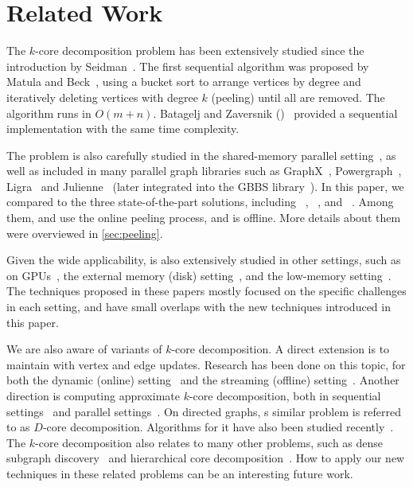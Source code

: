\section{Related Work}
The $k$-core decomposition problem has been extensively studied since the introduction by Seidman~\cite{seidman1983network}.
The first sequential algorithm was proposed by Matula and Beck~\cite{matula1983smallest},
using a bucket sort to arrange vertices by degree and iteratively deleting vertices with degree $k$ (peeling) until all are removed.
The algorithm runs in $O(m + n)$.
Batagelj and Zaversnik (\BZ)~\cite{batagelj2003m} provided a sequential implementation with the same time complexity. 

The \kcore{} problem is also carefully studied in the shared-memory parallel setting~\cite{dasari2014park,kabir2017parallel,dhulipala2017,montresor2011distributed,khaouid2015k,li2021k}, as well as included in many parallel graph libraries such as GraphX~\cite{gonzalez2014graphx}, Powergraph~\cite{gonzalez2012powergraph}, Ligra~\cite{shun2013ligra} and Julienne~\cite{dhulipala2017} (later integrated into the GBBS library~\cite{gbbs2021}).
In this paper, we compared to the three state-of-the-part solutions, including \ParK~\cite{dasari2014park}, \PKC~\cite{kabir2017parallel}, and \Julienne{}~\cite{dhulipala2017}.
Among them, \ParK and \PKC use the online peeling process, and \Julienne is offline.
More details about them were overviewed in \cref{sec:peeling}.

Given the wide applicability, \kcore is also extensively studied in other settings, such as on GPUs~\cite{mehrafsa2020vectorising, ahmad2023accelerating, zhao2024pico, li2021k, tripathy2018scalable, zhao2024speedcore, zhang2017accelerating, wang2016gunrock}, the external memory (disk) setting~\cite{cheng2011efficient, wen2018efficient}, and the low-memory setting~\cite{khaouid2015k}.
The techniques proposed in these papers mostly focused on the specific challenges in each setting, and have small overlaps with the new techniques introduced in this paper.

We are also aware of variants of $k$-core decomposition.
A direct extension is to maintain \kcore with vertex and edge updates.
Research has been done on this topic, for both the dynamic (online) setting~\cite{aksu2014distributed, aridhi2016distributed, gabert2022batch,liu2022parallel} and the streaming (offline) setting~\cite{sariyuce2013streaming, esfandiari2018parallel, sariyuce2016incremental}.
Another direction is computing approximate $k$-core decomposition, both in sequential settings~\cite{king2022computing} 
and parallel settings~\cite{esfandiari2018parallel,liu2022parallel, liu2024parallel, dhulipala2022differential}.
On directed graphs, s similar problem is referred to as $D$-core decomposition.
Algorithms for it have also been studied recently~\cite{luo2024efficient, liao2022distributed, giatsidis2013d}.
The $k$-core decomposition also relates to many other problems, 
such as dense subgraph discovery~\cite{luo2023scalable} and hierarchical core decomposition~\cite{chu2022hierarchical}.
How to apply our new techniques in these related problems can be an interesting future work.

